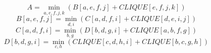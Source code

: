 \documentclass{article}
\begin{document}
$$ A =\min_{ a,e,f,j,k } \left( B\left[a,e,f,j\right]+CLIQUE\left[e,f,j,k\right]\right) $$
$$ B\left[ a,e,f,j \right] =\min_{ d,i } \left( C\left[a,d,f,i\right]+CLIQUE\left[d,e,i,j\right]\right) $$
$$ C\left[ a,d,f,i \right] =\min_{ b,g } \left( D\left[b,d,g,i\right]+CLIQUE\left[a,b,f,g\right]\right) $$
$$ D\left[ b,d,g,i \right] =\min_{ c,h } \left( CLIQUE\left[c,d,h,i\right]+CLIQUE\left[b,c,g,h\right]\right) $$
\end{document}
